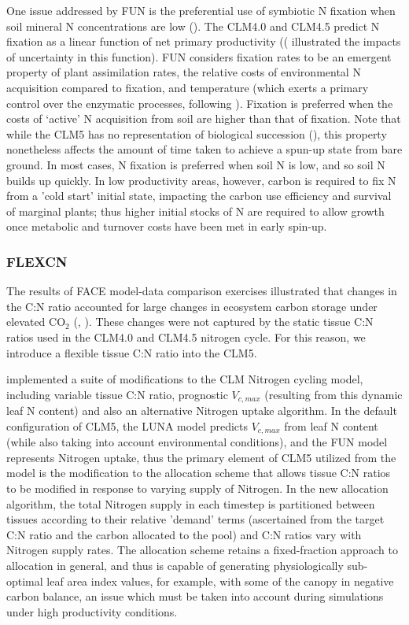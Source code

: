 \documentclass[draft,linenumbers]{agujournal}
\begin{document}
One issue addressed by FUN is the preferential use of symbiotic N fixation when soil mineral N concentrations are low (\cite{vitousek2002}). The CLM4.0 and CLM4.5 predict N fixation as a linear function of net primary productivity ((\cite{wieder2015} illustrated the impacts of uncertainty in this function).  FUN considers fixation rates to be an emergent property of plant assimilation rates, the relative costs of environmental N acquisition compared to fixation, and temperature (which exerts a primary control over the enzymatic processes, following \cite{houlton2008}). Fixation is preferred when the costs of `active' N acquisition from soil are higher than that of fixation. Note that while the CLM5 has no representation of biological succession (\cite{fisher2018}), this property nonetheless affects the amount of time taken to achieve a spun-up state from bare ground. In most cases, N fixation is preferred when soil N is low, and so soil N builds up quickly. In low productivity areas, however, carbon is required to fix N from a 'cold start' initial state, impacting the carbon use efficiency and survival of marginal plants; thus higher initial stocks of N are required to allow growth once metabolic and turnover costs have been met in early spin-up.

\subsubsection{FLEXCN}
The results of FACE model-data comparison exercises illustrated that changes in the C:N ratio accounted for large changes in ecosystem carbon storage under elevated CO$_{2}$ (\cite{zaehle2014}, \cite{medlyn2015using}).  These changes were not captured by the static tissue C:N ratios used in the CLM4.0 and CLM4.5 nitrogen cycle. For this reason, we introduce a flexible tissue C:N ratio into the CLM5.

\cite{ghimire2016} implemented a suite of modifications to the CLM Nitrogen cycling model, including variable tissue C:N ratio, prognostic $V_{c,max}$ (resulting from this dynamic leaf N content) and also an alternative Nitrogen uptake algorithm. In the default configuration of CLM5, the LUNA model predicts $V_{c,max}$ from leaf N content (while also taking into account environmental conditions), and the FUN model represents Nitrogen uptake, thus the primary element of CLM5 utilized from the \cite{ghimire2016} model is the modification to the allocation scheme that allows tissue C:N ratios to be modified in response to varying supply of Nitrogen. In the new allocation algorithm, the total Nitrogen supply in each timestep is partitioned between tissues according to their relative 'demand' terms (ascertained from the target C:N ratio and the carbon allocated to the pool) and C:N ratios vary with Nitrogen supply rates.  The allocation scheme retains a fixed-fraction approach to allocation in general, and thus is capable of generating physiologically sub-optimal leaf area index values, for example, with some of the canopy in negative carbon balance, an issue which must be taken into account during simulations under high productivity conditions. 
\end{document}
